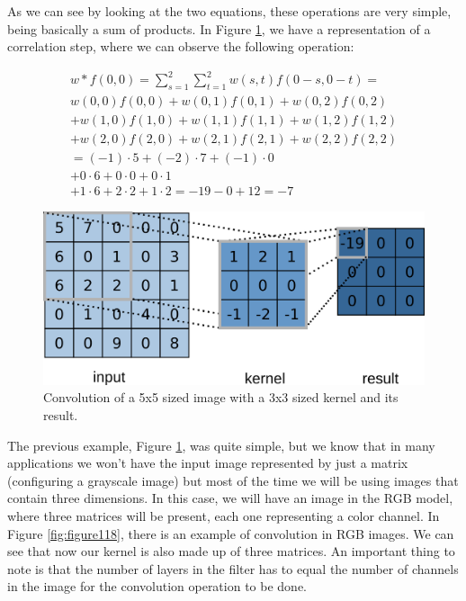 As we can see by looking at the two equations, these operations are very simple, being basically a sum of products. In Figure \ref{fig:figure117}, we have a representation of a correlation step, where we can observe the following operation:

\begin{equation}
\begin{split}
w*f(0,0)=\sum_{s=1}^{2}\sum_{t=1}^{2}w(s,t){f}(0-s,0-t)= \\
w(0,0)f(0,0)+w(0,1)f(0,1)+w(0,2)f(0,2) \\
+w(1,0)f(1,0)+w(1,1)f(1,1)+w(1,2)f(1,2) \\
+w(2,0)f(2,0)+w(2,1)f(2,1)+w(2,2)f(2,2)\\
=(-1)\cdot5+(-2)\cdot7+(-1)\cdot0\\
+0\cdot6+0\cdot0+0\cdot1\\
+1\cdot6+2\cdot2+1\cdot2
=-19-0+12=-7
\end{split}
\end{equation}

\begin{figure}
    \centering
    \includegraphics[scale=0.40]{images/figure117.png}
    \caption{Convolution of a 5x5 sized image with a 3x3 sized kernel and its result.}
    \label{fig:figure117}
\end{figure}

The previous example, Figure \ref{fig:figure117}, was quite simple, but we know that in many applications we won't have the input image represented by just a matrix (configuring a grayscale image) but most of the time we will be using images that contain three dimensions. In this case, we will have an image in the RGB model, where three matrices will be present, each one representing a color channel. In Figure \ref{fig:figure118}, there is an example of convolution in RGB images. We can see that now our kernel is also made up of three matrices. An important thing to note is that the number of layers in the filter has to equal the number of channels in the image for the convolution operation to be done.

